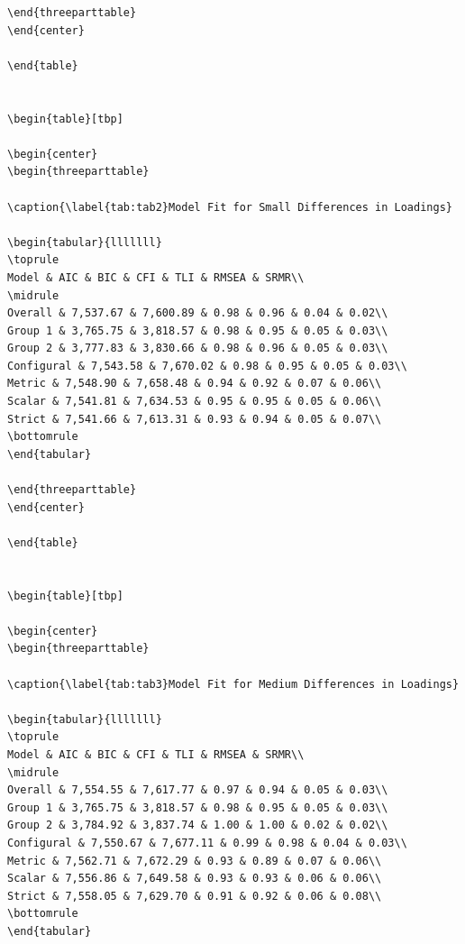 \documentclass[
  man]{apa6}
\begin{document}
\begin{verbatim}
\end{threeparttable}
\end{center}

\end{table}


\begin{table}[tbp]

\begin{center}
\begin{threeparttable}

\caption{\label{tab:tab2}Model Fit for Small Differences in Loadings}

\begin{tabular}{lllllll}
\toprule
Model & AIC & BIC & CFI & TLI & RMSEA & SRMR\\
\midrule
Overall & 7,537.67 & 7,600.89 & 0.98 & 0.96 & 0.04 & 0.02\\
Group 1 & 3,765.75 & 3,818.57 & 0.98 & 0.95 & 0.05 & 0.03\\
Group 2 & 3,777.83 & 3,830.66 & 0.98 & 0.96 & 0.05 & 0.03\\
Configural & 7,543.58 & 7,670.02 & 0.98 & 0.95 & 0.05 & 0.03\\
Metric & 7,548.90 & 7,658.48 & 0.94 & 0.92 & 0.07 & 0.06\\
Scalar & 7,541.81 & 7,634.53 & 0.95 & 0.95 & 0.05 & 0.06\\
Strict & 7,541.66 & 7,613.31 & 0.93 & 0.94 & 0.05 & 0.07\\
\bottomrule
\end{tabular}

\end{threeparttable}
\end{center}

\end{table}


\begin{table}[tbp]

\begin{center}
\begin{threeparttable}

\caption{\label{tab:tab3}Model Fit for Medium Differences in Loadings}

\begin{tabular}{lllllll}
\toprule
Model & AIC & BIC & CFI & TLI & RMSEA & SRMR\\
\midrule
Overall & 7,554.55 & 7,617.77 & 0.97 & 0.94 & 0.05 & 0.03\\
Group 1 & 3,765.75 & 3,818.57 & 0.98 & 0.95 & 0.05 & 0.03\\
Group 2 & 3,784.92 & 3,837.74 & 1.00 & 1.00 & 0.02 & 0.02\\
Configural & 7,550.67 & 7,677.11 & 0.99 & 0.98 & 0.04 & 0.03\\
Metric & 7,562.71 & 7,672.29 & 0.93 & 0.89 & 0.07 & 0.06\\
Scalar & 7,556.86 & 7,649.58 & 0.93 & 0.93 & 0.06 & 0.06\\
Strict & 7,558.05 & 7,629.70 & 0.91 & 0.92 & 0.06 & 0.08\\
\bottomrule
\end{tabular}


\end{verbatim}
\end{document}
